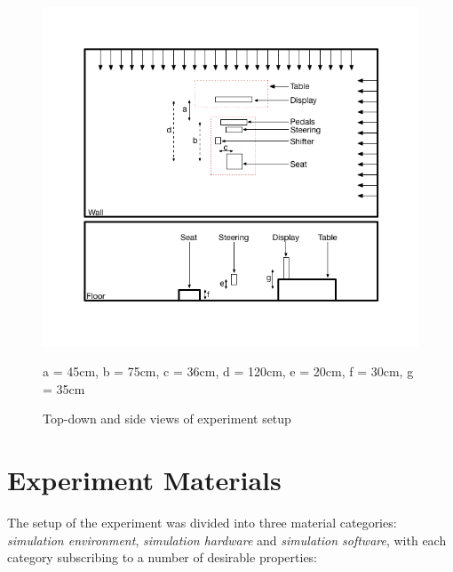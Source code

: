 \begin{figure}
	\centering
	\includegraphics[width=\textwidth]{images/experiment-setup-schematic.png}
	\caption[Experiment Setup Schematic]{Top-down and side views of experiment setup}
	a = 45cm, b = 75cm, c = 36cm, d = 120cm, e = 20cm, f = 30cm, g = 35cm
	\label{fig:meth-experiment-setup}
\end{figure}

\section{Experiment Materials}
\label{sec:meth-experiment-setup}
The setup of the experiment was divided into three material categories: \emph{simulation environment}, \emph{simulation hardware} and \emph{simulation software}, with each category subscribing to a number of desirable properties: 

